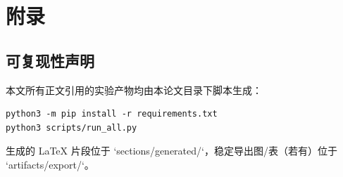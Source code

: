 \section{附录}

\subsection{可复现性声明}

本文所有正文引用的实验产物均由本论文目录下脚本生成：
\begin{verbatim}
python3 -m pip install -r requirements.txt
python3 scripts/run_all.py
\end{verbatim}
生成的 LaTeX 片段位于 `sections/generated/`，稳定导出图/表（若有）位于 `artifacts/export/`。

